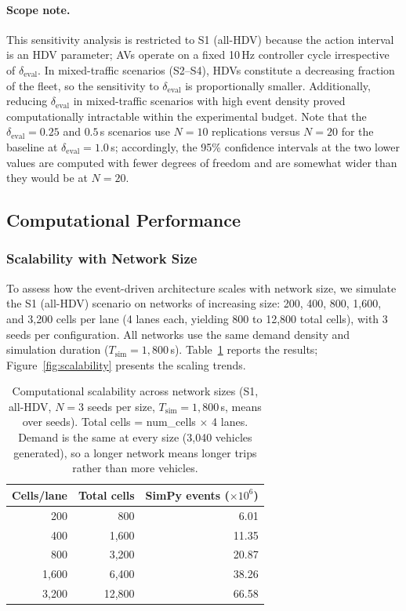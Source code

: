\documentclass[review,number]{elsarticle}
\begin{document}
\paragraph{Scope note.} This sensitivity analysis is restricted to S1 (all-HDV) because the action interval is an HDV parameter; AVs operate on a fixed 10\,Hz controller cycle irrespective of $\delta_{\text{eval}}$. In mixed-traffic scenarios (S2--S4), HDVs constitute a decreasing fraction of the fleet, so the sensitivity to $\delta_{\text{eval}}$ is proportionally smaller. Additionally, reducing $\delta_{\text{eval}}$ in mixed-traffic scenarios with high event density proved computationally intractable within the experimental budget. Note that the $\delta_{\text{eval}} = 0.25$ and $0.5$\,s scenarios use $N = 10$ replications versus $N = 20$ for the baseline at $\delta_{\text{eval}} = 1.0$\,s; accordingly, the 95\% confidence intervals at the two lower values are computed with fewer degrees of freedom and are somewhat wider than they would be at $N = 20$.


\subsection{Computational Performance}
\label{sec:exp_performance_new}

\subsubsection{Scalability with Network Size}
\label{sec:exp_scalability}

To assess how the event-driven architecture scales with network size, we simulate the S1 (all-HDV) scenario on networks of increasing size: 200, 400, 800, 1{,}600, and 3{,}200 cells per lane (4 lanes each, yielding 800 to 12{,}800 total cells), with 3 seeds per configuration. All networks use the same demand density and simulation duration ($T_{\text{sim}} = 1{,}800$\,s). Table~\ref{tab:scalability} reports the results; Figure~\ref{fig:scalability} presents the scaling trends.

\begin{table}[ht]
\centering
\caption{Computational scalability across network sizes (S1, all-HDV, $N = 3$ seeds per size, $T_{\text{sim}} = 1{,}800$\,s, means over seeds). Total cells = num\_cells $\times$ 4 lanes. Demand is the same at every size (3{,}040 vehicles generated), so a longer network means longer trips rather than more vehicles.}
\label{tab:scalability}
\begin{tabular}{@{}rrr@{}}
\toprule
Cells/lane & Total cells & SimPy events ($\times 10^6$) \\
\midrule
200 & 800 & 6.01 \\
400 & 1{,}600 & 11.35 \\
800 & 3{,}200 & 20.87 \\
1{,}600 & 6{,}400 & 38.26 \\
3{,}200 & 12{,}800 & 66.58 \\
\bottomrule
\end{tabular}
\end{table}
\end{document}
